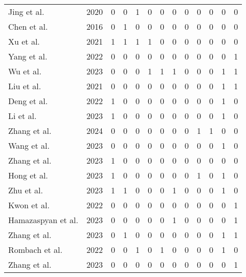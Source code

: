 \begin{table}[t]
{\begin{tabular}{lcccccccccccc}
                Jing et al.\citep{41jing2020dynamic} & 2020 & 0 & 0 & 1 & 0 & 0 & 0 & 0 & 0 & 0 & 0 & 0 \\
                Chen et al.\citep{43chen2016fast} & 2016 & 0 & 1 & 0 & 0 & 0 & 0 & 0 & 0 & 0 & 0 & 0 \\
                Xu et al.\citep{44xu2021drb} & 2021 & 1 & 1 & 1 & 1 & 0 & 0 & 0 & 0 & 0 & 0 & 0 \\
                Yang et al.\citep{45yang2022pastiche} & 2022 & 0 & 0 & 0 & 0 & 0 & 0 & 0 & 0 & 0 & 0 & 1 \\
                Wu et al.\citep{47wu2023preserving} & 2023 & 0 & 0 & 0 & 1 & 1 & 1 & 0 & 0 & 0 & 1 & 1 \\
                Liu et al.\citep{48liu2021adaattn} & 2021 & 0 & 0 & 0 & 0 & 0 & 0 & 0 & 0 & 0 & 1 & 1 \\
                Deng et al.\citep{49deng2022stytr2} & 2022 & 1 & 0 & 0 & 0 & 0 & 0 & 0 & 0 & 0 & 1 & 0 \\
                Li et al.\citep{50li2023compact} & 2023 & 1 & 0 & 0 & 0 & 0 & 0 & 0 & 0 & 0 & 1 & 0 \\
                Zhang et al.\citep{51zhang2024rethink} & 2024 & 0 & 0 & 0 & 0 & 0 & 0 & 0 & 1 & 1 & 0 & 0 \\
                Wang et al.\citep{52wang2023interactive} & 2023 & 0 & 0 & 0 & 0 & 0 & 0 & 0 & 0 & 0 & 1 & 0 \\
                Zhang et al.\citep{53zhang2023edge} & 2023 & 1 & 0 & 0 & 0 & 0 & 0 & 0 & 0 & 0 & 0 & 0 \\
                Hong et al.\citep{54hong2023aespa} & 2023 & 1 & 0 & 0 & 0 & 0 & 0 & 0 & 1 & 0 & 1 & 0 \\
                Zhu et al.\citep{55zhu2023all} & 2023 & 1 & 1 & 0 & 0 & 0 & 1 & 0 & 0 & 0 & 1 & 0 \\
                Kwon et al.\citep{57kwon2022clipstyler} & 2022 & 0 & 0 & 0 & 0 & 0 & 0 & 0 & 0 & 0 & 0 & 1 \\
                Hamazaspyan et al.\citep{59hamazaspyan2023diffusion} & 2023 & 0 & 0 & 0 & 0 & 0 & 1 & 0 & 0 & 0 & 0 & 1 \\
                Zhang et al.\citep{60zhang2024artbank} & 2023 & 0 & 1 & 0 & 0 & 0 & 0 & 0 & 0 & 0 & 1 & 1 \\
                Rombach et al.\citep{61rombach2022high} & 2022 & 0 & 0 & 1 & 0 & 1 & 0 & 0 & 0 & 0 & 1 & 0 \\
                Zhang et al.\citep{62zhang2023inversion} & 2023 & 0 & 0 & 0 & 0 & 0 & 0 & 0 & 0 & 0 & 0 & 1 \\

\end{tabular}}
\end{table}
